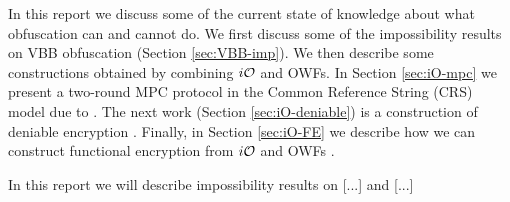 \documentclass[]{article}
\begin{document}

In this report we discuss some of the current state of knowledge about what obfuscation can and cannot do.
We first discuss some of the impossibility results on VBB obfuscation (Section \ref{sec:VBB-imp}). %
We then describe some constructions obtained by combining $i\mathcal{O}$ and OWFs. In Section \ref{sec:iO-mpc} we present a two-round MPC protocol in the Common Reference String (CRS) model due to \cite{iO-mpc}. The next work (Section \ref{sec:iO-deniable}) is a construction of deniable encryption \cite{iO-deniable}. Finally, in Section \ref{sec:iO-FE} we describe how we can construct functional encryption \cite{} %
from $i\mathcal{O}$ and OWFs \cite{iO-FE}.




In this report we will describe impossibility results on [...] and [...]







{}

\end{document}
